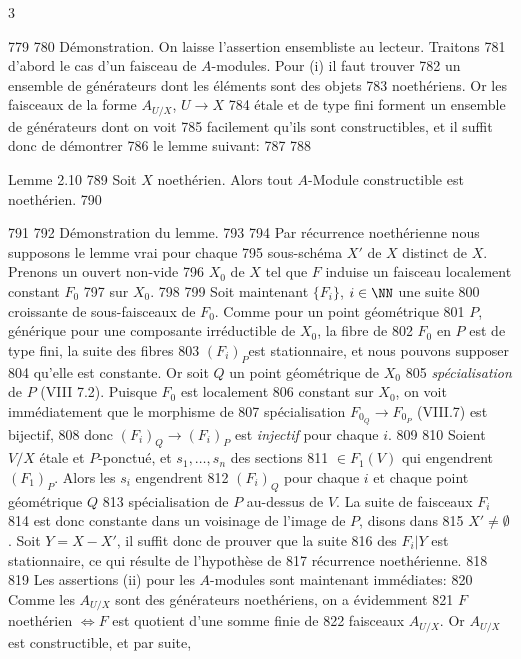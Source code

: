 3	\documentclass[10pt]{../fichiers-configuration-latex/smfart}
\begin{document}
   779	
   780	Démonstration. On laisse l'assertion ensembliste au lecteur. Traitons
   781	d'abord le cas d'un faisceau de $A$-modules. Pour (i) il faut trouver
   782	un ensemble de générateurs dont les éléments sont des objets
   783	noethériens. Or les faisceaux de la forme $A_{U/X}$, $U\rightarrow X$
   784	étale et de type fini forment un ensemble de générateurs dont on voit
   785	facilement qu'ils sont constructibles, et il suffit donc de démontrer
   786	le lemme suivant:
   787	
   788	\begin{enonce*}{Lemme 2.10}
   789	Soit $X$ noethérien. Alors tout $A$-Module constructible est noethérien.
   790	\end{enonce*}
   791	
   792	Démonstration du lemme.
   793	
   794	Par récurrence noethérienne nous supposons le lemme vrai pour chaque
   795	sous-schéma $X'$ de $X$ distinct de $X$. Prenons un ouvert non-vide
   796	$X_0$ de $X$ tel que $F$ induise un faisceau localement constant $F_0$
   797	sur $X_0$.
   798	
   799	Soit maintenant $\{F_i\}$, $i\in \NN$ une suite
   800	croissante de sous-faisceaux de $F_0$. Comme pour un point géométrique
   801	$P$, générique pour une composante irréductible de $X_0$, la fibre de
   802	$F_0$ en $P$ est de type fini, la suite des fibres
   803	$(F_i)_P$\pageoriginale est stationnaire, et nous pouvons supposer
   804	qu'elle est constante. Or soit $Q$ un point géométrique de $X_0$
   805	\emph{spécialisation} de $P$ (VIII 7.2). Puisque $F_0$ est localement
   806	constant sur $X_0$, on voit immédiatement que le morphisme de
   807	spécialisation $F_{0_Q}\rightarrow F_{0_P}$ (VIII.7) est bijectif,
   808	donc $(F_i)_Q\rightarrow (F_i)_P$ est \emph{injectif} pour chaque $i$.
   809	
   810	Soient $V/X$ étale et $P$-ponctué, et $s_1,\ldots,s_n$ des sections
   811	$\in F_1(V)$ qui engendrent $(F_1)_P$. Alors les $s_i$ engendrent
   812	$(F_i)_Q$ pour chaque $i$ et chaque point géométrique $Q$
   813	spécialisation de $P$ au-dessus de $V$. La suite de faisceaux $F_i$
   814	est donc constante dans un voisinage de l'image de $P$, disons dans
   815	$X'\neq ∅$. Soit $Y=X-X'$, il suffit donc de prouver que la suite
   816	des $F_i| Y$ est stationnaire, ce qui résulte de l'hypothèse de
   817	récurrence noethérienne.
   818	
   819	Les assertions (ii) pour les $A$-modules sont maintenant immédiates:
   820	Comme les $A_{U/X}$ sont des générateurs noethériens, on a évidemment
   821	$F$ noethérien $\Leftrightarrow F$ est quotient d'une somme finie de
   822	faisceaux $A_{U/X}$. Or $A_{U/X}$ est constructible, et par suite,
\end{document}
